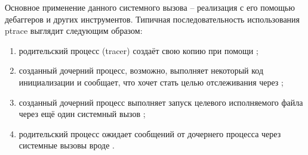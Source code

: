 Основное применение данного системного вызова -- реализация с его помощью дебаггеров и других инструментов. Типичная последовательность использования ptrace выглядит следующим образом:

\begin{enumerate}
	\item родительский процесс (tracer) создаёт свою копию при помощи ;
	
	\item созданный дочерний процесс, возможно, выполняет некоторый код инициализации и сообщает, что хочет стать целью отслеживания через ;
	
	\item созданный дочерний процесс выполняет запуск целевого исполняемого файла через ещё один системный вызов ;
	
	\item родительский процесс ожидает сообщений от дочернего процесса через системные вызовы вроде .
\end{enumerate}

